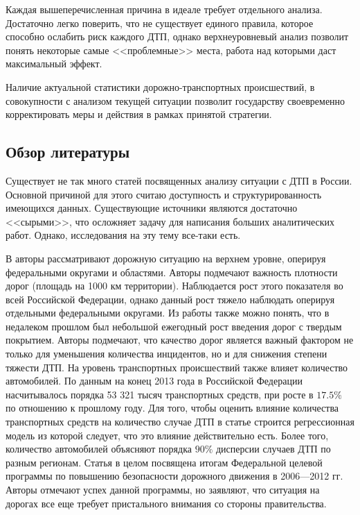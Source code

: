 \documentclass[a4paper, 14pt]{article}
\begin{document}
Каждая вышеперечисленная причина в идеале требует отдельного анализа. Достаточно легко поверить, что не существует единого правила, которое способно ослабить риск каждого ДТП, однако верхнеуровневый анализ позволит понять некоторые самые <<проблемные>> места, работа над которыми даст максимальный эффект.

Наличие актуальной статистики дорожно-транспортных происшествий, в совокупности с анализом текущей ситуации позволит государству своевременно корректировать меры и действия в рамках принятой стратегии. 

\subsection{Обзор литературы}
Существует не так много статей посвященных анализу ситуации с ДТП в России. Основной причиной для этого считаю доступность и структурированность имеющихся данных. Существующие источники являются достаточно <<сырыми>>, что осложняет задачу для написания больших аналитических работ. Однако, исследования на эту тему все-таки есть.

В \cite{ivliev_econ_stat_analysis} авторы рассматривают дорожную ситуацию на верхнем уровне, оперируя федеральными округами и областями. Авторы подмечают важность плотности дорог (площадь на 1000 км территории). Наблюдается рост этого показателя во всей Российской Федерации, однако данный рост тяжело наблюдать оперируя отдельными федеральными округами. Из работы также можно понять, что в недалеком прошлом был небольшой ежегодный рост введения дорог с твердым покрытием. Авторы подмечают, что качество дорог является важный фактором не только для уменьшения количества инцидентов, но и для снижения степени тяжести ДТП. На уровень транспортных происшествий также влияет количество автомобилей. По данным на конец 2013 года в Российской Федерации насчитывалось порядка 53 321 тысяч транспортных средств, при росте в $17.5\%$ по отношению к прошлому году. Для того, чтобы оценить влияние количества транспортных средств на количество случае ДТП в статье строится регрессионная модель из которой следует, что это влияние действительно есть. Более того, количество автомобилей объясняют порядка $90\%$ дисперсии случаев ДТП по разным регионам. Статья в целом посвящена итогам Федеральной целевой программы по повышению безопасности дорожного движения в 2006---2012 гг. Авторы отмечают успех данной программы, но заявляют, что ситуация на дорогах все еще требует пристального внимания со стороны правительства.
\end{document}
